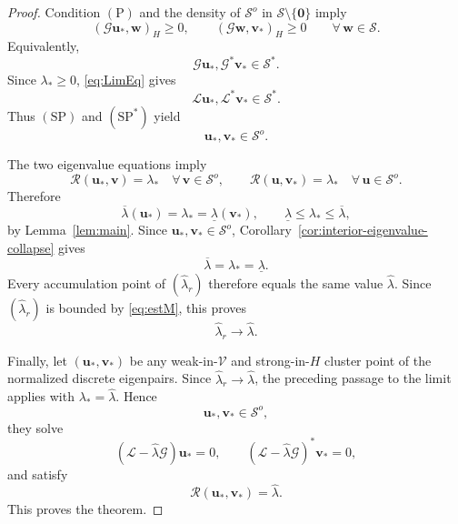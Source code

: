 \documentclass[preprint,10pt]{elsarticle}
\theoremstyle{plain}
\theoremstyle{definition}
\theoremstyle{remark}
\begin{document}
\begin{proof}
	Condition \(\mathrm{(P)}\) and the density of
	\(\mathcal S^o\) in \(\mathcal S\setminus\{\mathbf0\}\) imply
	\[
	(\mathcal G\mathbf u_*,\mathbf w)_H\ge0,
	\qquad
	(\mathcal G\mathbf w,\mathbf v_*)_H\ge0
	\qquad
	\forall\,\mathbf w\in\mathcal S.
	\]
	Equivalently,
	\[
	\mathcal G\mathbf u_*,
	\mathcal G^*\mathbf v_*
	\in
	\mathcal S^*.
	\]
	Since \(\lambda_*\ge0\), \eqref{eq:LimEq} gives
	\[
	\mathcal L\mathbf u_*,
	\mathcal L^*\mathbf v_*
	\in
	\mathcal S^*.
	\]
	Thus \(\mathrm{(SP)}\) and \(\mathrm{(SP^*)}\) yield
	\[
	\mathbf u_*,\mathbf v_*\in\mathcal S^o.
	\]
	
	The two eigenvalue equations imply
	\[
	\mathcal R(\mathbf u_*,\mathbf v)=\lambda_*
	\quad
	\forall\,\mathbf v\in\mathcal S^o,
	\qquad
	\mathcal R(\mathbf u,\mathbf v_*)=\lambda_*
	\quad
	\forall\,\mathbf u\in\mathcal S^o.
	\]
	Therefore
	\begin{equation}\label{eq:limit-quasi-pair}
		\overline\lambda(\mathbf u_*)
		=
		\lambda_*
		=
		\underline\lambda(\mathbf v_*),
		\qquad
		\underline\lambda\le\lambda_*\le\overline\lambda,
	\end{equation}
	by Lemma~\ref{lem:main}. Since
	\(\mathbf u_*,\mathbf v_*\in\mathcal S^o\),
	Corollary~\ref{cor:interior-eigenvalue-collapse} gives
	\[
	\overline\lambda
	=
	\lambda_*
	=
	\underline\lambda.
	\]
	Every accumulation point of \((\hat\lambda_r)\) therefore equals the same
	value \(\hat\lambda\). Since \((\hat\lambda_r)\) is bounded by
	\eqref{eq:estM}, this proves
	\[
	\hat\lambda_r\to\hat\lambda.
	\]
	
	Finally, let \((\mathbf u_*,\mathbf v_*)\) be any weak-in-\(\mathcal V\) and
	strong-in-\(H\) cluster point of the normalized discrete eigenpairs. Since
	\(\hat\lambda_r\to\hat\lambda\), the preceding passage to the limit applies
	with \(\lambda_*=\hat\lambda\). Hence
	\[
	\mathbf u_*,\mathbf v_*
	\in
	\mathcal S^o,
	\]
	they solve
	\[
	(\mathcal L-\hat\lambda\mathcal G)\mathbf u_*=0,
	\qquad
	(\mathcal L-\hat\lambda\mathcal G)^*\mathbf v_*=0,
	\]
	and satisfy
	\[
	\mathcal R(\mathbf u_*,\mathbf v_*)=\hat\lambda.
	\]
	This proves the theorem.
\end{proof}
\end{document}
